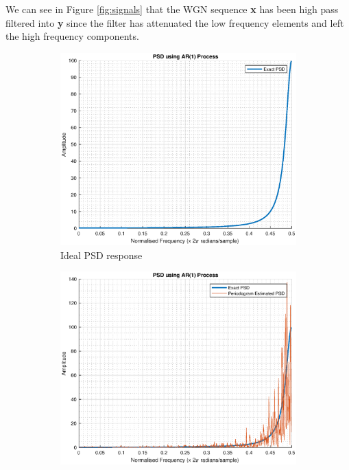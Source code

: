 \documentclass{article}
\begin{document}
We can see in Figure \ref{fig:signals} that the WGN sequence \textbf{x} has been high pass filtered into \textbf{y} since the filter has attenuated the low frequency elements and left the high frequency components.

\begin{figure}[h!]
\centering
\begin{subfigure}{0.32\textwidth}
\centering
\includegraphics[width = \textwidth]{ar1_psd_exact}
\caption{Ideal PSD response}
\label{fig:ar1_psd_exact}
\end{subfigure}
\begin{subfigure}{0.32\textwidth}
\centering
\includegraphics[width = \textwidth]{ar1_psd_est}

\end{subfigure}
\end{figure}
\end{document}

